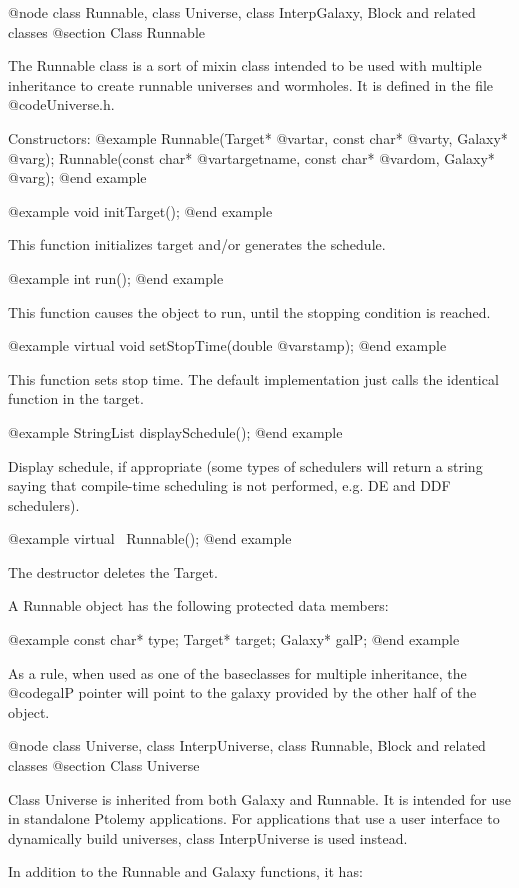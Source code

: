 @node class Runnable, class Universe, class InterpGalaxy, Block and related classes
@section Class Runnable

The Runnable class is a sort of mixin class intended to be used with
multiple inheritance to create runnable universes and wormholes.  It
is defined in the file @code{Universe.h}.

Constructors:
@example
Runnable(Target* @var{tar}, const char* @var{ty}, Galaxy* @var{g});
Runnable(const char* @var{targetname}, const char* @var{dom}, Galaxy* @var{g});
@end example

@example
void initTarget();
@end example

This function initializes target and/or generates the schedule.

@example
int run();
@end example

This function causes the object to run, until the stopping condition is reached.

@example
virtual void setStopTime(double @var{stamp});
@end example

This function sets stop time.  The default implementation just
calls the identical function in the target.

@example
StringList displaySchedule();
@end example

Display schedule, if appropriate (some types of schedulers will return a
string saying that compile-time scheduling is not performed, e.g. DE
and DDF schedulers).

@example
virtual ~Runnable();
@end example

The destructor deletes the Target.

A Runnable object has the following protected data members:

@example
const char* type;
Target* target;
Galaxy* galP;
@end example

As a rule, when used as one of the baseclasses for multiple inheritance,
the @code{galP} pointer will point to the galaxy provided by the other
half of the object.

@node class Universe, class InterpUniverse, class Runnable, Block and related classes
@section Class Universe

Class Universe is inherited from both Galaxy and Runnable.  It is
intended for use in standalone Ptolemy applications.  For applications
that use a user interface to dynamically build universes, class
InterpUniverse is used instead.

In addition to the Runnable and Galaxy functions, it has:


